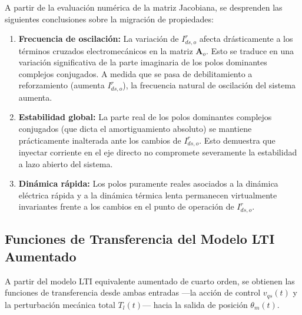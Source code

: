 \documentclass[12pt, a4paper,journal, onecolumn, compsoc]{IEEEtran}
\begin{document}
A partir de la evaluación numérica de la matriz Jacobiana, se desprenden las siguientes conclusiones sobre la migración de propiedades:
\begin{enumerate}
    \item \textbf{Frecuencia de oscilación:} La variación de $I^r_{ds,o}$ afecta drásticamente a los términos cruzados electromecánicos en la matriz $\mathbf{A}_o$. Esto se traduce en una variación significativa de la parte imaginaria de los polos dominantes complejos conjugados. A medida que se pasa de debilitamiento a reforzamiento (aumenta $I^r_{ds,o}$), la frecuencia natural de oscilación del sistema aumenta.
    \item \textbf{Estabilidad global:} La parte real de los polos dominantes complejos conjugados (que dicta el amortiguamiento absoluto) se mantiene prácticamente inalterada ante los cambios de $I^r_{ds,o}$. Esto demuestra que inyectar corriente en el eje directo no compromete severamente la estabilidad a lazo abierto del sistema.
    \item \textbf{Dinámica rápida:} Los polos puramente reales asociados a la dinámica eléctrica rápida y a la dinámica térmica lenta permanecen virtualmente invariantes frente a los cambios en el punto de operación de $I^r_{ds,o}$.
\end{enumerate}

\subsection{Funciones de Transferencia del Modelo LTI Aumentado}
A partir del modelo LTI equivalente aumentado de cuarto orden, se obtienen las funciones de transferencia desde ambas entradas ---la acción de control $v_{qs}(t)$ y la perturbación mecánica total $T_l(t)$--- hacia la salida de posición $\theta_m(t)$.
\end{document}
